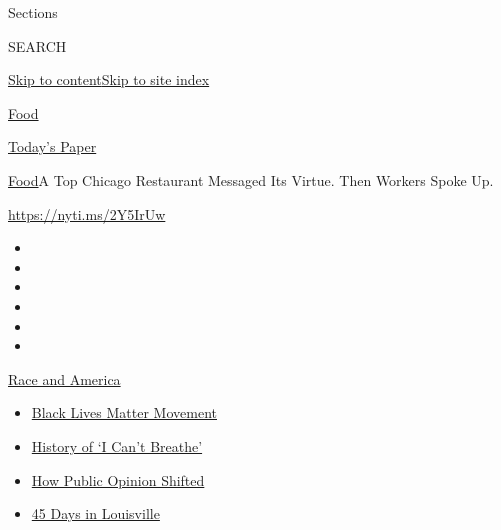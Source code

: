 Sections

SEARCH

\protect\hyperlink{site-content}{Skip to
content}\protect\hyperlink{site-index}{Skip to site index}

\href{https://www.nytimes.com/section/food}{Food}

\href{https://myaccount.nytimes.com/auth/login?response_type=cookie\&client_id=vi}{}

\href{https://www.nytimes.com/section/todayspaper}{Today's Paper}

\href{/section/food}{Food}\textbar{}A Top Chicago Restaurant Messaged
Its Virtue. Then Workers Spoke Up.

\url{https://nyti.ms/2Y5IrUw}

\begin{itemize}
\item
\item
\item
\item
\item
\item
\end{itemize}

\href{https://www.nytimes.com/news-event/george-floyd-protests-minneapolis-new-york-los-angeles?action=click\&pgtype=Article\&state=default\&region=TOP_BANNER\&context=storylines_menu}{Race
and America}

\begin{itemize}
\tightlist
\item
  \href{https://www.nytimes.com/interactive/2020/07/03/us/george-floyd-protests-crowd-size.html?action=click\&pgtype=Article\&state=default\&region=TOP_BANNER\&context=storylines_menu}{Black
  Lives Matter Movement}
\item
  \href{https://www.nytimes.com/interactive/2020/06/28/us/i-cant-breathe-police-arrest.html?action=click\&pgtype=Article\&state=default\&region=TOP_BANNER\&context=storylines_menu}{History
  of `I Can't Breathe'}
\item
  \href{https://www.nytimes.com/interactive/2020/06/10/upshot/black-lives-matter-attitudes.html?action=click\&pgtype=Article\&state=default\&region=TOP_BANNER\&context=storylines_menu}{How
  Public Opinion Shifted}
\item
  \href{https://www.nytimes.com/interactive/2020/07/16/us/black-lives-matter-protests-louisville-breonna-taylor.html?action=click\&pgtype=Article\&state=default\&region=TOP_BANNER\&context=storylines_menu}{45
  Days in Louisville}
\end{itemize}

